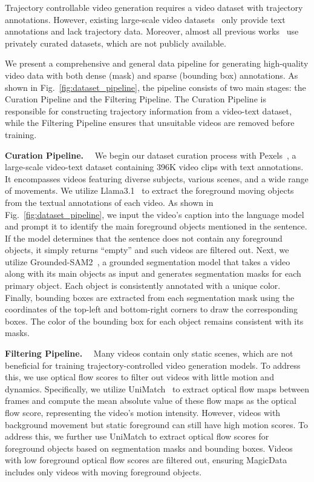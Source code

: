 Trajectory controllable video generation requires a video dataset with trajectory annotations. However, existing large-scale video datasets~\cite{bain2021frozen, chen2024panda, ju2024miradata} only provide text annotations and lack trajectory data. Moreover, almost all previous works~\cite{zhang2025tora, zhou2025trackgo, wang2024motionctrl, li2025image, yin2023dragnuwa} use privately curated datasets, which are not publicly available.

We present a comprehensive and general data pipeline for generating high-quality video data with both dense (mask) and sparse (bounding box) annotations.
As shown in Fig.~\ref{fig:dataset_pipeline}, the pipeline consists of two main stages: the Curation Pipeline and the Filtering Pipeline. The Curation Pipeline is responsible for constructing trajectory information from a video-text dataset, while the Filtering Pipeline ensures that unsuitable videos are removed before training.

\vspace{0.2cm}
\noindent\textbf{Curation Pipeline.} 
~~We begin our dataset curation process with Pexels~\cite{Pexels-400k}, a large-scale video-text dataset containing 396K video clips with text annotations. It encompasses videos featuring diverse subjects, various scenes, and a wide range of movements.
We utilize Llama3.1~\cite{touvron2023llama} to extract the foreground moving objects from the textual annotations of each video. As shown in Fig.~\ref{fig:dataset_pipeline}, we input the video’s caption into the language model and prompt it to identify the main foreground objects mentioned in the sentence. If the model determines that the sentence does not contain any foreground objects, it simply returns “empty” and such videos are filtered out.
Next, we utilize Grounded-SAM2~\cite{ravi2024sam, ren2024grounded}, a grounded segmentation model that takes a video along with its main objects as input and generates segmentation masks for each primary object. Each object is consistently annotated with a unique color.
Finally, bounding boxes are extracted from each segmentation mask using the coordinates of the top-left and bottom-right corners to draw the corresponding boxes. The color of the bounding box for each object remains consistent with its masks.

\vspace{0.2cm}
\noindent\textbf{Filtering Pipeline.} 
~~Many videos contain only static scenes, which are not beneficial for training trajectory-controlled video generation models. To address this, we use optical flow scores to filter out videos with little motion and dynamics. Specifically, we utilize UniMatch~\cite{xu2023unifying} to extract optical flow maps between frames and compute the mean absolute value of these flow maps as the optical flow score, representing the video’s motion intensity. However, videos with background movement but static foreground can still have high motion scores. To address this, we further use UniMatch to extract optical flow scores for foreground objects based on segmentation masks and bounding boxes. Videos with low foreground optical flow scores are filtered out, ensuring MagicData includes only videos with moving foreground objects.

